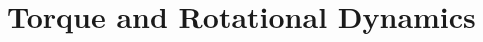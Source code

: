 \documentclass[../mech.tex]{subfiles}
\begin{document}
\chapter{Torque and Rotational Dynamics}
\end{document}
